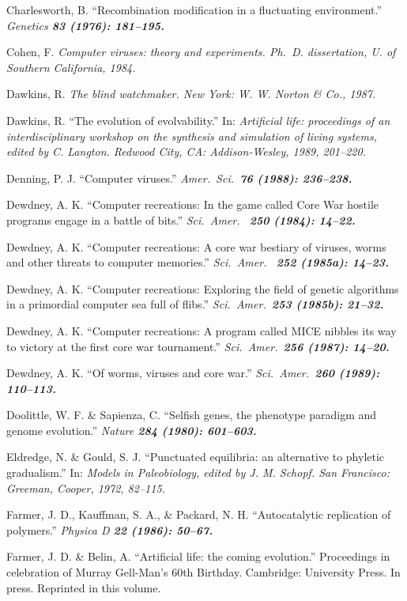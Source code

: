Charlesworth, B. ``Recombination modification in a fluctuating
environment.''  \it Genetics \bf 83 \rm (1976): 181--195.

Cohen, F.  \it Computer viruses: theory and experiments\rm .
Ph.\ D. dissertation, U. of Southern California, 1984.

Dawkins, R.  \it The blind watchmaker\rm .  New York: W. W. Norton
\& Co., 1987.

Dawkins, R.  ``The evolution of evolvability.''  In: \it Artificial life:
proceedings of an interdisciplinary workshop on the synthesis and simulation
of living systems\rm , edited by C. Langton.  Redwood City, CA:
Addison-Wesley, 1989, 201--220.

Denning, P. J.  ``Computer viruses.''  \it Amer.\ Sci.\ \bf 76 \rm
(1988): 236--238.

Dewdney, A. K.  ``Computer recreations:  In the game called Core
War hostile programs engage in a battle of bits.''  \it Sci.\ Amer.\ \bf
250 \rm (1984): 14--22.

Dewdney, A. K.  ``Computer recreations:  A core war bestiary of
viruses, worms and other threats to computer memories.''  \it Sci.\ Amer.\ \bf
252 \rm (1985a): 14--23.

Dewdney, A. K.  ``Computer recreations:  Exploring the field of
genetic algorithms in a primordial computer sea full of flibs.''
\it Sci.\ Amer.\ \bf 253 \rm (1985b): 21--32.

Dewdney, A. K.  ``Computer recreations:  A program called MICE
nibbles its way to victory at the first core war tournament.'' \it Sci.\
Amer.\ \bf 256 \rm (1987): 14--20.

Dewdney, A. K.  ``Of worms, viruses and core war.''
\it Sci.\ Amer.\ \bf 260 \rm (1989): 110--113.

Doolittle, W. F. \& Sapienza, C.  ``Selfish genes, the phenotype
paradigm and genome evolution.''  \it Nature \bf 284 \rm (1980): 601--603.

Eldredge, N. \& Gould, S. J.  ``Punctuated equilibria: an alternative
to phyletic gradualism.''  In: \it Models in Paleobiology\rm , edited by
J. M. Schopf.  San Francisco: Greeman, Cooper, 1972, 82--115.

Farmer, J. D., Kauffman, S. A., \& Packard, N. H.  ``Autocatalytic
replication of polymers.''  \it Physica D \bf 22 \rm (1986): 50--67.

Farmer, J. D. \& Belin, A.  ``Artificial life: the
coming evolution.''  Proceedings in celebration of Murray Gell-Man's 60th
Birthday.  Cambridge: University Press.  In press.  Reprinted in this volume.

